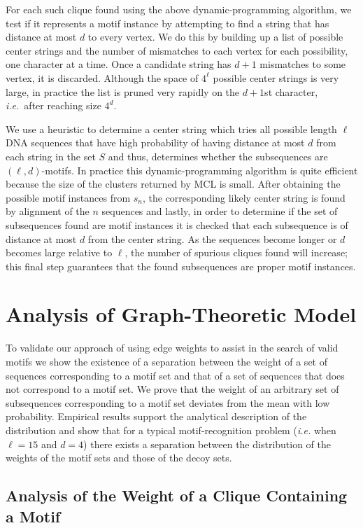 For each such clique found using the above dynamic-programming algorithm, we test if it represents a motif instance by attempting to find a string that has distance at most $d$ to every vertex. We do this by building up a list of possible center strings and the number of mismatches to each vertex for each possibility, one character at a time. Once a candidate string has $d+1$ mismatches to some vertex, it is discarded. Although the space of $4^{\ell}$ possible center strings is very large, in practice the list is pruned very rapidly on the $d+1$st character, {\em i.e.}\ after reaching size $4^d$.

We use a heuristic to determine a center string which tries all possible length $\ell$ DNA sequences that have high probability of having distance at most $d$ from each string in the set $S$ and thus, determines whether the subsequences are $(\ell, d)$-motifs.  In practice this dynamic-programming algorithm is quite efficient because the size of the clusters returned by MCL is small.  After obtaining the possible motif instances from $s_n$, the corresponding likely center string is found by alignment of the $n$ sequences and lastly, in order to determine if the set of subsequences found are motif instances it is checked that each subsequence is of distance at most $d$ from the center string.  As the sequences become longer or $d$ becomes large relative to $\ell$, the number of spurious cliques found will increase; this final step guarantees that the found subsequences are proper motif instances. 

\section{Analysis of Graph-Theoretic Model}

To validate our approach of using edge weights to assist in the search of valid motifs we show the existence of a separation between the weight of a set of sequences corresponding to a motif set and that of a set of sequences that does not correspond to a motif set.  We prove that the weight of an arbitrary set of subsequences corresponding to a motif set deviates from the mean with low probability.  Empirical results support the analytical description of the distribution and show that for a  typical motif-recognition problem ({\em i.e.} when $\ell = 15$ and $d = 4$) there exists a separation between the distribution of the weights of the motif sets and those of the decoy sets.

\subsection{Analysis of the Weight of a Clique Containing a Motif} \label{section:mcl_wmr_analysis}
 

